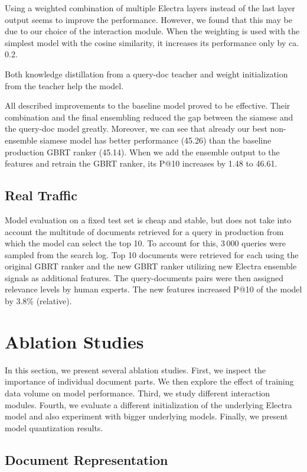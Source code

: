 \documentclass[letterpaper]{article} \usepackage{aaai22 }  \usepackage{times}  \usepackage{helvet}  \usepackage{courier}  \usepackage[hyphens]{url}  \usepackage{graphicx} \usepackage{amsmath,amsfonts,amssymb, mathabx,bm,bbm}
\begin{document}
Using a weighted combination of multiple Electra layers instead of the last layer output seems to improve the performance. However, we found that this may be due to our choice of the interaction module. When the weighting is used with the simplest model with the cosine similarity, it increases its performance only by ca. 0.2.

Both knowledge distillation from a query-doc teacher and weight initialization from the teacher help the model.

All described improvements to the baseline model proved to be effective. Their combination and the final ensembling reduced the gap between the siamese and the query-doc model greatly. Moreover, we can see that already our best non-ensemble siamese model has better performance (45.26) than the baseline production GBRT ranker (45.14). When we add the ensemble output to the features and retrain the GBRT ranker, its P@10 increases by 1.48 to 46.61.

\subsection{Real Traffic}
Model evaluation on a fixed test set is cheap and stable, but does not take into account the multitude of documents retrieved for a query in production from which the model can select the top 10. To account for this, 3\,000 queries were sampled from the search log. Top 10 documents were retrieved for each using the original GBRT ranker and the new GBRT ranker utilizing new Electra ensemble signals as additional features. The query-documents pairs were then assigned relevance levels by human experts. The new features increased P@10 of the model by 3.8\% (relative).


\section{Ablation Studies}\label{sec:ablation_studies}

In this section, we present several ablation studies. First, we inspect the importance of individual document parts. We then explore the effect of training data volume on model performance. Third, we study different interaction modules. Fourth, we evaluate a different initialization of the underlying Electra model and also experiment with bigger underlying models. Finally, we present model quantization results.

\subsection{Document Representation}
\end{document}
